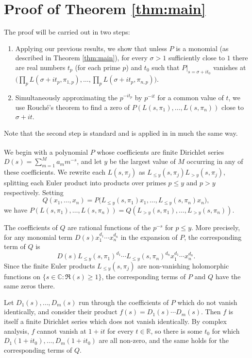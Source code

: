 \documentclass[11pt]{amsart}
\theoremstyle{remark}
\numberwithin{theorem}{section}
\numberwithin{equation}{section}
\newcommand{\R}{\mathbb{R}}
\newcommand{\C}{\mathbb{C}}
\begin{document}
\section{Proof of Theorem \ref{thm:main}}\label{sec:main}
The proof will be carried out in two steps:
\begin{enumerate}[(1)]
\item
Applying our previous results, we
show that unless $P$ is a monomial (as described in Theorem \ref{thm:main}), 
for every $\sigma > 1$ sufficiently close to $1$
there are real numbers $t_p$ (for each prime $p$) and $t_0$ 
such that $P|_{s=\sigma+it_0}$
vanishes at $\bigl(\prod_pL(\sigma+it_p,\pi_{1,p}),\ldots,
\prod_pL(\sigma+it_p,\pi_{n,p})\bigr)$.
\item Simultaneously approximating the $p^{-it_p}$ by $p^{-it}$ for a
common value of $t$, we use Rouch\'e's theorem to find a zero of
$P(L(s,\pi_1),\ldots,L(s,\pi_n))$ close to $\sigma+it$.
\end{enumerate}
Note that the second step is standard and is applied in \cite{SW}
in much the same way.
\\
\\
We begin with a polynomial $P$ whose coefficients are 
finite Dirichlet series $D(s)=\sum_{m=1}^M a_mm^{-s}$, and let
$y$ be the largest value of $M$ occurring in any of these coefficients.
We rewrite each $L(s,\pi_j)$ as
$L_{\leq{y}}(s,\pi_j)L_{>y}(s,\pi_j)$,
splitting each Euler product into products over primes $p\leq y$
and $p>y$ respectively. Setting
$$
Q(x_1,\ldots,x_n)
=P\bigl(L_{\le{y}}(s,\pi_1)x_1,\ldots,L_{\le{y}}(s,\pi_n)x_n\bigr),
$$
we have
$P(L(s,\pi_1),\dots,L(s,\pi_n))=Q(L_{>y}(s,\pi_1),\dots,L_{>y}(s,\pi_n))$.

The coefficients of $Q$ are rational functions of
the $p^{-s}$ for $p\le y$.  More precisely, for any monomial term
$D(s)x_1^{d_1}\cdots x_n^{d_n}$ in the expansion of $P$, the corresponding
term of $Q$ is 
\[D(s)L_{\le{y}}(s,\pi_1)^{d_1}\cdots{}L_{\le{y}}(s,\pi_n)^{d_n}
x_1^{d_1}\cdots{}x_n^{d_n}.
\]  Since the finite
Euler products $L_{\le{y}}(s,\pi_j)$ are non-vanishing holomorphic functions
on $\{s\in\C:\Re(s)\ge1\}$, the corresponding terms of $P$ and $Q$
have the same zeros there.

Let $D_1(s),\ldots,D_m(s)$ run through the coefficients of $P$ which do
not vanish identically, and consider their product
$f(s)=D_1(s)\cdots D_m(s)$. Then $f$ is itself a finite Dirichlet series
which does not vanish identically. By complex analysis, $f$ cannot
vanish at $1+it$ for every $t\in\R$, so there is some $t_0$
for which $D_1(1+it_0),\ldots,D_m(1+it_0)$ are all non-zero, and the same holds for the corresponding terms of $Q$.
\end{document}
